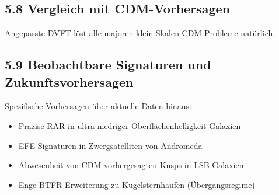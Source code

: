 	\subsection{5.8 Vergleich mit CDM-Vorhersagen}
	
	\begin{table}[htbp]
		\centering
		\caption{Vorhersagen auf galaktischer Skala}
		\label{tab:galaktisch}
	\end{table}
	
	Angepasste DVFT löst alle majoren klein-Skalen-CDM-Probleme natürlich.
	
	\subsection{5.9 Beobachtbare Signaturen und Zukunftsvorhersagen}
	
	Spezifische Vorhersagen über aktuelle Daten hinaus:
	\begin{itemize}
		\item Präzise RAR in ultra-niedriger Oberflächenhelligkeit-Galaxien
		\item EFE-Signaturen in Zwergsatelliten von Andromeda
		\item Abwesenheit von CDM-vorhergesagten Kusps in LSB-Galaxien
		\item Enge BTFR-Erweiterung zu Kugelsternhaufen (Übergangsregime)
	\end{itemize}
	
